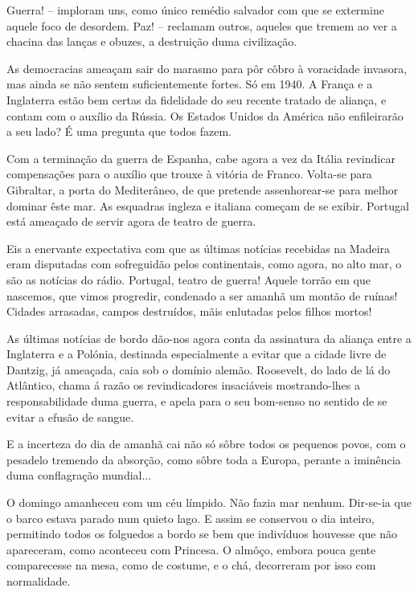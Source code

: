 \documentclass[9pt]{article}
\begin{document}
Guerra! --  imploram uns, como único remédio salvador com que se extermine
aquele foco de desordem. Paz! -- reclamam outros, aqueles que tremem ao ver
a chacina das lan\-ças e obuzes, a destrui\-ção duma civiliza\-ção.

As democracias ameaçam sair do marasmo para pôr côbro à voracidade invasora, mas ainda se não sentem suficientemente fortes. Só em 1940. A Fran\-ça
e a Inglaterra estão bem certas da fidelidade do seu recente tratado de
alian\-ça, e contam com o auxílio da Rússia. Os Estados Unidos da América não
enfileirarão a seu lado? É uma pregunta que todos fazem.

Com a termina\-ção da guerra de Espanha, cabe agora a vez da Itália revindicar compensa\-ções para o auxílio que trouxe à vitória de Franco. Volta-se para Gibraltar, a porta do Mediterâneo, de que pretende as\-se\-nho\-re\-ar-se
para me\-lhor dominar êste mar. As esquadras ingleza e italiana começam de se
exibir. Portugal está ameaçado de servir agora de teatro de guerra.

Eis a enervante expectativa com que as últimas notícias recebidas na
Madeira eram disputadas com sofreguidão pelos continentais, como agora, no
alto mar, o são as notícias do rádio. Portugal, teatro de guerra! Aquele torrão em que nascemos, que vimos progredir, condenado a ser a\-ma\-nhã um montão
de ruínas! Cidades arrasadas, campos destruídos, mãis enlutadas pelos fi\-lhos
mortos!

As últimas notícias de bordo dão-nos agora conta da assinatura da
alian\-ça entre a Inglaterra e a Polónia, destinada especialmente a evitar
que a cidade livre de Dantzig, já ameaçada, caia sob o domínio alemão. Roosevelt, do lado de lá do Atlântico, chama á razão os revindicadores insaciáveis
mostrando-\-lhes a responsabilidade duma guerra, e apela para o
seu bom-senso no sentido de se evitar a efusão de sangue.

E a incerteza do dia de a\-ma\-nhã cai não só sôbre todos os pequenos
povos, com o pesadelo tremendo da absor\-ção, como sôbre toda a Europa, perante
a iminência duma conflagra\-ção mundial...

O domingo amanheceu com um céu límpido. Não fazia mar nenhum. Dir-se-ia que o barco estava parado num quieto lago. E assim se conservou o
dia inteiro, permitindo todos os folguedos a bordo se bem que indivíduos
houvesse que não apareceram, como aconteceu com Princesa. O almôço, embora
pouca gente comparecesse na mesa, como de costume, e o chá, decorreram por
isso com normalidade.
\end{document}
